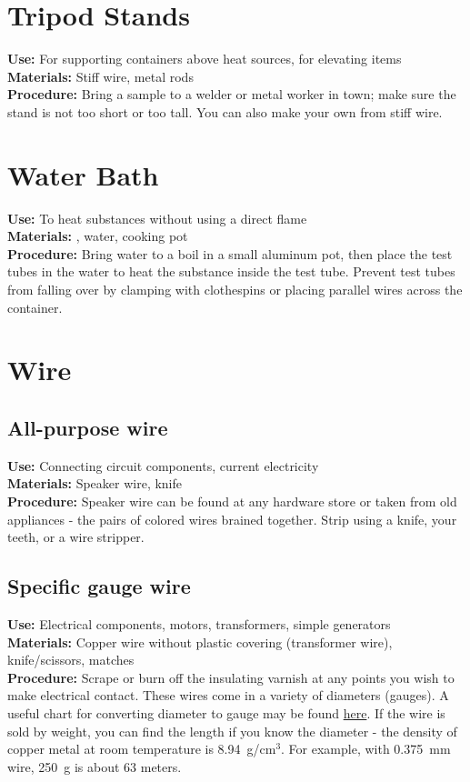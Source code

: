 \section*{Tripod Stands}
\vspace{-10pt}
\textbf{Use:} For supporting containers above heat sources, for elevating items\\
\textbf{Materials:} Stiff wire, metal rods\\
\textbf{Procedure:} Bring a sample to a welder or metal worker in town; make sure the stand is not too short or too tall. You can also make your own from stiff wire.

\section*{Water Bath}
\label{sec:hotwaterbathes}
\vspace{-10pt}
\textbf{Use:} To heat substances without using a direct flame\\
\textbf{Materials:} , water, cooking pot\\
\textbf{Procedure:} Bring water to a boil in a small aluminum pot, then place the test tubes in the water to heat the substance inside the test tube. Prevent test tubes from falling over by clamping with clothespins or placing parallel wires across the container.

\section*{Wire}
\label{sec:wire}
\subsection*{All-purpose wire}
\vspace{-6pt}
\textbf{Use:} Connecting circuit components, current electricity\\
\textbf{Materials:} Speaker wire, knife\\
\textbf{Procedure:} Speaker wire can be found at any hardware store or taken from old appliances - the pairs of colored wires brained together. Strip using a knife, your teeth, or a wire stripper.

\subsection*{Specific gauge wire}
\vspace{-6pt}
\textbf{Use:} Electrical components, motors, transformers, simple generators\\
\textbf{Materials:} Copper wire without plastic covering (transformer wire), knife\slash scissors, matches\\
\textbf{Procedure:} Scrape or burn off the insulating varnish at any points you wish to make electrical contact. 
These wires come in a variety of diameters (gauges). A useful chart for converting diameter to gauge may be found \href{http://www.dave-cushman.net/elect/wiregauge.html}{here}. If the wire is sold by weight, 
you can find the length if you know the diameter - the density of copper metal at room temperature is 8.94~g/cm$^{3}$. For example, with 0.375~mm wire, 250~g is about 63 meters.

